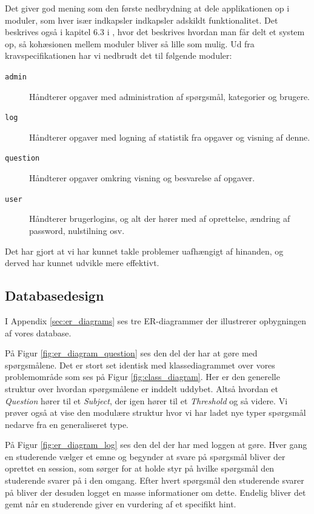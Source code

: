 \documentclass[11pt, a4paper]{article}
\begin{document}
Det giver god mening som den første nedbrydning at dele applikationen op i moduler, som hver især indkapsler indkapsler adskildt funktionalitet. Det beskrives også i kapitel 6.3 i \cite{OOSE}, hvor det beskrives hvordan man får delt et system op, så kohæsionen mellem moduler bliver så lille som mulig. Ud fra kravspecifikationen har vi nedbrudt det til følgende moduler:
\begin{description}
    \item[\texttt{admin}] Håndterer opgaver med administration af spørgsmål, kategorier og brugere.
    \item[\texttt{log}] Håndterer opgaver med logning af statistik fra opgaver og visning af denne.
    \item[\texttt{question}] Håndterer opgaver omkring visning og besvarelse af opgaver.
    \item[\texttt{user}] Håndterer brugerlogins, og alt der hører med af oprettelse, ændring af password, nulstilning osv.
\end{description}

Det har gjort at vi har kunnet takle problemer uafhængigt af hinanden, og derved har kunnet udvikle mere effektivt.

\subsection{Databasedesign}
\label{sub:databasedesign}
I Appendix \ref{sec:er_diagrams} ses tre ER-diagrammer der illustrerer opbygningen af vores database. 

På Figur \ref{fig:er_diagram_question} ses den del der har at gøre med spørgsmålene. Det er stort set identisk med klassediagrammet over vores problemområde som ses på Figur \ref{fig:class_diagram}. Her er den generelle struktur over hvordan spørgsmålene er inddelt uddybet. Altså hvordan et \emph{Question} hører til et \emph{Subject}, der igen hører til et \emph{Threshold} og så videre. Vi prøver også at vise den modulære struktur hvor vi har ladet nye typer spørgsmål nedarve fra en generaliseret type.

På Figur \ref{fig:er_diagram_log} ses den del der har med loggen at gøre. Hver gang en studerende vælger et emne og begynder at svare på spørgsmål bliver der oprettet en session, som sørger for at holde styr på hvilke spørgsmål den studerende svarer på i den omgang. Efter hvert spørgsmål den studerende svarer på bliver der desuden logget en masse informationer om dette. Endelig bliver det gemt når en studerende giver en vurdering af et specifikt hint.
\end{document}
